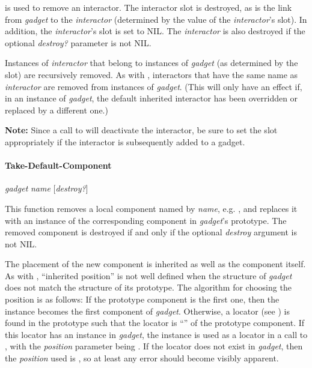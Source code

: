 is used to remove an interactor.  The interactor 
slot is destroyed, as is the link from {\it gadget} to the {\it interactor}
(determined by the value of the {\it interactor}'s  slot).
In addition, the {\it interactor}'s  slot is set to NIL.
The {\it interactor} is also destroyed if the optional {\it destroy?}
parameter is not NIL.

Instances of {\it interactor} that belong to instances of {\it gadget}
(as determined by the  slot) are recursively
removed.
As with ,
interactors that have the same name as {\it interactor}
are removed from instances of {\it gadget}.  (This will only have
an effect if, in an instance of {\it gadget}, the default inherited
interactor has been overridden or replaced by a different one.)

{\bf Note:} Since a call to  will deactivate
the interactor, be sure to set the  slot appropriately if
the interactor is subsequently added to a gadget.

\paragraph{Take-Default-Component}
 {\it gadget} {\it name} [{\it destroy?}]\value{method}

This function removes a local component named by {\it name}, e.g. ,
and replaces it with an instance of the corresponding component in
{\it gadget}'s prototype.  The removed component is destroyed if and only if
the optional {\it destroy} argument is not NIL.

The placement of the new component is inherited as well as the component
itself.  As with , ``inherited position'' is not
well defined when the structure of {\it gadget} does not match
the structure of its prototype.  The algorithm for choosing the
position is as follows:
If the prototype component is the first one, then the instance
becomes the first component of {\it gadget}.  Otherwise, a locator (see
) is found
in the prototype such that the locator is ``'' of the
prototype component.  If this locator has an instance in {\it gadget},
the instance is used as a locator in a
call to , with the {\it position} parameter being
.  If the locator does not exist in {\it gadget}, then the
{\it position} used is , so at least any error should become
visibly apparent.

